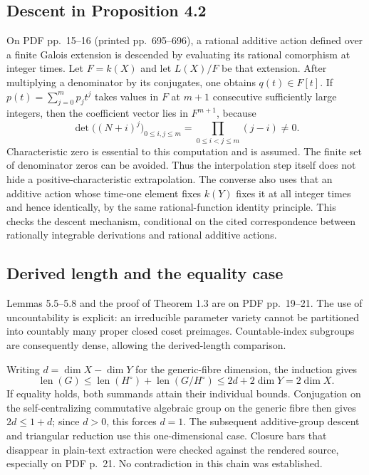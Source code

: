 \documentclass[10pt]{article}
\begin{document}
\subsection*{Descent in Proposition 4.2}
On PDF pp. 15–16 (printed pp. 695–696), a rational additive action defined over a finite Galois extension is descended by evaluating its rational comorphism at integer times. Let \(F=k(X)\) and let \(L(X)/F\) be that extension. After multiplying a denominator by its conjugates, one obtains \(q(t)\in F[t]\). If \(p(t)=\sum_{j=0}^{m}p_jt^j\) takes values in \(F\) at \(m+1\) consecutive sufficiently large integers, then the coefficient vector lies in \(F^{m+1}\), because \[\det\big((N+i)^j\big)_{0\le i,j\le m}
   =\prod_{0\le i<j\le m}(j-i)\ne0.\] Characteristic zero is essential to this computation and is assumed. The finite set of denominator zeros can be avoided. Thus the interpolation step itself does not hide a positive-characteristic extrapolation. The converse also uses that an additive action whose time-one element fixes \(k(Y)\) fixes it at all integer times and hence identically, by the same rational-function identity principle. This checks the descent mechanism, conditional on the cited correspondence between rationally integrable derivations and rational additive actions.\par
\subsection*{Derived length and the equality case}
Lemmas 5.5–5.8 and the proof of Theorem 1.3 are on PDF pp. 19–21. The use of uncountability is explicit: an irreducible parameter variety cannot be partitioned into countably many proper closed coset preimages. Countable-index subgroups are consequently dense, allowing the derived-length comparison.\par
Writing \(d=\dim X-\dim Y\) for the generic-fibre dimension, the induction gives \[\operatorname{len}(G)\le \operatorname{len}(H^\circ)+\operatorname{len}(G/H^\circ)
 \le 2d+2\dim Y=2\dim X.\] If equality holds, both summands attain their individual bounds. Conjugation on the self-centralizing commutative algebraic group on the generic fibre then gives \(2d\le 1+d\); since \(d>0\), this forces \(d=1\). The subsequent additive-group descent and triangular reduction use this one-dimensional case. Closure bars that disappear in plain-text extraction were checked against the rendered source, especially on PDF p. 21. No contradiction in this chain was established.\par
\end{document}
